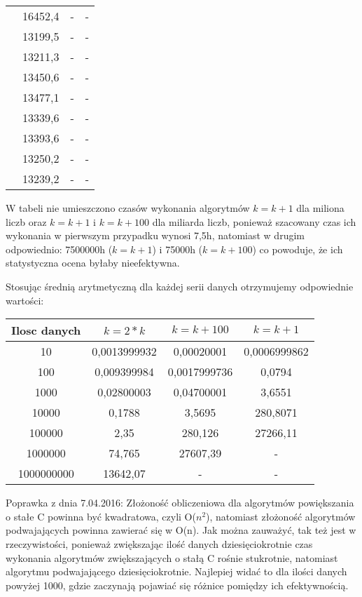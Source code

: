 \documentclass[10pt, a4paper]{article}
\begin{document}
\begin{flushleft}
\begin{table}[h]
\begin{tabular}{|c|c|c|c|}
 & 16452,4 & - & - \\
 & 13199,5 & - & - \\
 & 13211,3 & - & - \\
 & 13450,6 & - & - \\
 & 13477,1 & - & - \\
 & 13339,6 & - & - \\
 & 13393,6 & - & - \\
 & 13250,2 & - & - \\
 & 13239,2 & - & - \\ \hline
\end{tabular}
\end{table}

W tabeli nie umieszczono czasów wykonania algorytmów $k=k+1$ dla miliona liczb oraz $k=k+1$ i $k=k+100$ dla miliarda liczb, ponieważ szacowany czas ich wykonania w pierwszym przypadku wynosi 7,5h, natomiast w drugim odpowiednio: 7500000h ($k=k+1$) i 75000h ($k=k+100$) co powoduje, że ich statystyczna ocena byłaby nieefektywna.

\newpage

Stosując średnią arytmetyczną dla każdej serii danych otrzymujemy odpowiednie wartości:
\begin{table}[h]
\centering
\begin{tabular}{|c|c|c|c|} \hline
Ilosc danych & $k=2*k$ & $k=k+100$ & $k=k+1$ \\ \hline
10 & 0,0013999932 & 0,00020001 & 0,0006999862 \\ \hline
100 & 0,009399984 & 0,0017999736 & 0,0794 \\ \hline
1000 & 0,02800003 & 0,04700001 & 3,6551 \\ \hline
10000 & 0,1788 & 3,5695 & 280,8071 \\ \hline
100000 & 2,35 & 280,126 & 27266,11 \\ \hline
1000000 & 74,765 & 27607,39 & - \\ \hline
1000000000 & 13642,07 & - & - \\ \hline
\end{tabular}
\end{table} \newline

Poprawka z dnia 7.04.2016: \newline
Złożoność obliczeniowa dla algorytmów powiększania o stałe C powinna być kwadratowa, czyli O($n^2$), natomiast złożoność algorytmów podwajających powinna zawierać się w O(n). Jak można zauważyć, tak też jest w rzeczywistości, ponieważ zwiększając ilość danych dziesięciokrotnie czas wykonania algorytmów zwiększających o stałą C rośnie stukrotnie, natomiast algorytmu podwajającego dziesięciokrotnie. Najlepiej widać to dla ilości danych powyżej 1000, gdzie zaczynają pojawiać się różnice pomiędzy ich efektywnością. \newline \newline


\end{flushleft}
\end{document}
